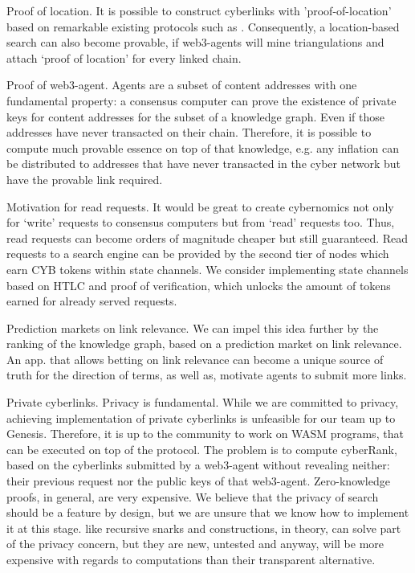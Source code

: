 \documentclass[8pt,oneside]{amsart}
\newcommand{\linkgreen}[2]{\href{#1}{\color{green}{#2}}}
\newcommand{\code}[1]{{\PlayBold #1}}
\begin{document}
\begin{Abstract}
\code{Proof of location}. It is possible to construct cyberlinks with 'proof-of-location' based on remarkable existing protocols such as \linkgreen{https://ipfs.io/ipfs/QmZYKGuLHf2h1mZrhiP2FzYsjj3tWt2LYduMCRbpgi5pKG}{Foam}. Consequently, a location-based search can also become provable, if web3-agents will mine triangulations and attach ‘proof of location’ for every linked chain.

\code{Proof of web3-agent}. Agents are a subset of content addresses with one fundamental property: a consensus computer can prove the existence of private keys for content addresses for the subset of a knowledge graph. Even if those addresses have never transacted on their chain. Therefore, it is possible to compute much provable essence on top of that knowledge, e.g. any inflation can be distributed to addresses that have never transacted in the cyber network but have the provable link required.

\code{Motivation for read requests}. It would be great to create cybernomics not only for ‘write’ requests to consensus computers but from ‘read’ requests too. Thus, read requests can become orders of magnitude cheaper but still guaranteed. Read requests to a search engine can be provided by the second tier of nodes which earn CYB tokens within state channels. We consider implementing state channels based on HTLC and proof of verification, which unlocks the amount of tokens earned for already served requests.

\code{Prediction markets on link relevance}. We can impel this idea further by the ranking of the knowledge graph, based on a prediction market on link relevance. An app. that allows betting on link relevance can become a unique source of truth for the direction of terms, as well as, motivate agents to submit more links.

\code{Private cyberlinks}. Privacy is fundamental. While we are committed to privacy, achieving implementation of private cyberlinks is unfeasible for our team up to Genesis. Therefore, it is up to the community to work on WASM programs, that can be executed on top of the protocol. The problem is to compute cyberRank, based on the cyberlinks submitted by a web3-agent without revealing neither: their previous request nor the public keys of that web3-agent. Zero-knowledge proofs, in general, are very expensive. We believe that the privacy of search should be a feature by design, but we are unsure that we know how to implement it at this stage. \linkgreen{https://ipfs.io/ipfs/Qmdje3AmtsfjX9edWAxo3LFhV9CTAXoUvwGR7wHJXnc2Gk}{Coda} like recursive snarks and \linkgreen{https://ipfs.io/ipfs/Qmd99xmraYip9cVv8gRMy6Y97Bkij8qUYArGDME7CzFasg}{MimbleWimble} constructions, in theory, can solve part of the privacy concern, but they are new, untested and anyway, will be more expensive with regards to computations than their transparent alternative.


\end{Abstract}
\end{document}
